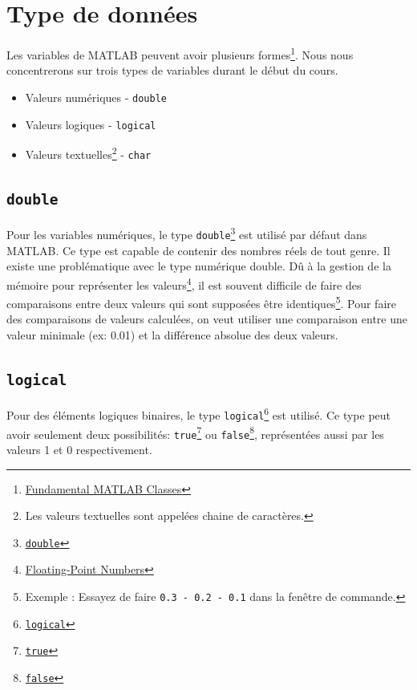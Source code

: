 \documentclass[]{tufte-handout}
\providecommand{\tightlist}{%
  \setlength{\itemsep}{0pt}\setlength{\parskip}{0pt}}
\begin{document}
\hypertarget{type-de-donnuxe9es}{%
\section{Type de données}\label{type-de-donnuxe9es}}

Les variables de MATLAB peuvent avoir plusieurs formes\footnote{\href{https://www.mathworks.com/help/matlab/matlab_prog/fundamental-matlab-classes.html}{Fundamental
  MATLAB Classes}}. Nous nous concentrerons sur trois types de variables
durant le début du cours.

\begin{itemize}
\tightlist
\item
  Valeurs numériques - \texttt{double}
\item
  Valeurs logiques - \texttt{logical}
\item
  Valeurs textuelles\footnote{Les valeurs textuelles sont appelées
    chaine de caractères.} - \texttt{char}
\end{itemize}

\hypertarget{double}{%
\subsection{\texorpdfstring{\texttt{double}}{double}}\label{double}}

Pour les variables numériques, le type \texttt{double}\footnote{\href{https://www.mathworks.com/help/matlab/ref/double.html}{\texttt{double}}}
est utilisé par défaut dans MATLAB. Ce type est capable de contenir des
nombres réels de tout genre. Il existe une problématique avec le type
numérique double. Dû à la gestion de la mémoire pour représenter les
valeurs\footnote{\href{https://www.mathworks.com/help/matlab/matlab_prog/floating-point-numbers.html}{Floating-Point
  Numbers}}, il est souvent difficile de faire des comparaisons entre
deux valeurs qui sont supposées être identiques\footnote{Exemple :
  Essayez de faire \texttt{0.3\ -\ 0.2\ -\ 0.1} dans la fenêtre de
  commande.}. Pour faire des comparaisons de valeurs calculées, on veut
utiliser une comparaison entre une valeur minimale (ex: 0.01) et la
différence absolue des deux valeurs.

\hypertarget{logical}{%
\subsection{\texorpdfstring{\texttt{logical}}{logical}}\label{logical}}

Pour des éléments logiques binaires, le type \texttt{logical}\footnote{\href{https://www.mathworks.com/help/matlab/ref/logical.html}{\texttt{logical}}}
est utilisé. Ce type peut avoir seulement deux possibilités:
\texttt{true}\footnote{\href{https://www.mathworks.com/help/matlab/ref/true.html}{\texttt{true}}}
ou \texttt{false}\footnote{\href{https://www.mathworks.com/help/matlab/ref/false.html}{\texttt{false}}},
représentées aussi par les valeurs 1 et 0 respectivement.
\end{document}

